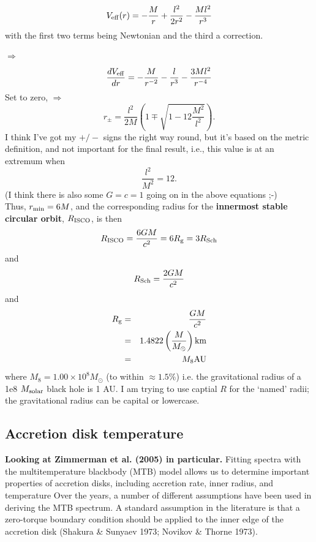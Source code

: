 \documentclass[11pt,a4paper]{article}
\begin{document}
\begin{equation}
V_{\rm eff}(r) = - \frac{M}{r}  + \frac{l^2}{2r^2} - \frac{Ml^2}{r^3}
\end{equation}
with the first two terms being Newtonian and the third a correction. 

$\Rightarrow$
\begin{equation}
\frac{d V_{\rm eff}}{dr} = - \frac{M}{r^{-2}}  - \frac{l}{r^{3}} - \frac{3 M l^2}{r^{-4}}
\end{equation}
Set to zero, $\Rightarrow$
\begin{equation}
r_{\pm} = \frac{l^2}{2M} \left (1 \mp \sqrt{1 - 12   \frac{M^2}{l^2}     }   \right ).
\end{equation}
I think I've got my $+/-$ signs the right way round, but it's based on the metric definition, 
and not important for the final result, i.e.,  this value is at an extremum when 
\begin{equation}
\frac{l^2}{M^2} = 12.
\end{equation}
(I think there is also some $G=c=1$ going on in the above equations ;-)\\
Thus, $r_{\rm min} = 6 M$, and the corresponding radius for the
{\bf innermost stable circular orbit}, $R_{\rm ISCO}$, is then
\begin{equation}
R_{\rm ISCO} = \frac{6 G M}{c^{2}} = 6 R_{\rm g} =  3 R_{\rm Sch}
\end{equation}
and 
\begin{equation}
R_{\rm Sch} = \frac{2 G M}{c^2}
\end{equation}
and 
\begin{eqnarray}
R_{\rm g}  & = &  \frac{G M}{c^2} \\
                 & = &   1.4822 \left ( \frac{M}{M_{\odot}} \right ) {\rm km}\\
              & = & M_{8} {\rm AU}\\
\end{eqnarray}
where $M_{8} = 1.00 \times10^{8} M_{\odot}$ (to within $\approx1.5\%$)
i.e. the gravitational radius of a 1e8 $M_{\rm solar}$ black hole is 1
AU.  I am trying to use captial $R$ for the `named' radii; the
gravitational radius can be capital or lowercase.

\subsection{Accretion disk temperature}
{\bf Looking at Zimmerman et al. (2005) in particular.}
Fitting spectra with the multitemperature blackbody (MTB) model allows
us to determine important properties of accretion disks, including
accretion rate, inner radius, and temperature
Over the years, a number of different assumptions have been used in
deriving the MTB spectrum. A standard assumption in the literature is
that a zero-torque boundary condition should be applied to the inner
edge of the accretion disk (Shakura \& Sunyaev 1973; Novikov \& Thorne
1973).
\end{document}
